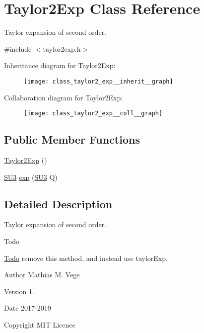 \hypertarget{class_taylor2_exp}{}\section{Taylor2\+Exp Class Reference}
\label{class_taylor2_exp}


Taylor expansion of second order.  




{\ttfamily \#include $<$taylor2exp.\+h$>$}



Inheritance diagram for Taylor2\+Exp\+:\nopagebreak
\begin{figure}[H]
\begin{center}
\leavevmode
\texttt{[image: class\_taylor2\_exp\_\_inherit\_\_graph]}
\end{center}
\end{figure}


Collaboration diagram for Taylor2\+Exp\+:\nopagebreak
\begin{figure}[H]
\begin{center}
\leavevmode
\texttt{[image: class\_taylor2\_exp\_\_coll\_\_graph]}
\end{center}
\end{figure}
\subsection*{Public Member Functions}
\begin{DoxyCompactItemize}
\item 
\mbox{\hyperlink{class_taylor2_exp_ac3b48be4c567e163f7baaa041121a93f}{Taylor2\+Exp}} ()
\item 
\mbox{\hyperlink{class_s_u3}{S\+U3}} \mbox{\hyperlink{class_taylor2_exp_af1d32ac99447c063e364ebf37ba2752e}{exp}} (\mbox{\hyperlink{class_s_u3}{S\+U3}} Q)
\end{DoxyCompactItemize}


\subsection{Detailed Description}
Taylor expansion of second order. 

\begin{DoxyRefDesc}{Todo}
\item[\mbox{\hyperlink{todo__todo000002}{Todo}}]remove this method, and instead use taylor\+Exp.\end{DoxyRefDesc}


\begin{DoxyAuthor}{Author}
Mathias M. Vege 
\end{DoxyAuthor}
\begin{DoxyVersion}{Version}
1. 
\end{DoxyVersion}
\begin{DoxyDate}{Date}
2017-\/2019 
\end{DoxyDate}
\begin{DoxyCopyright}{Copyright}
M\+IT Licence 
\end{DoxyCopyright}


